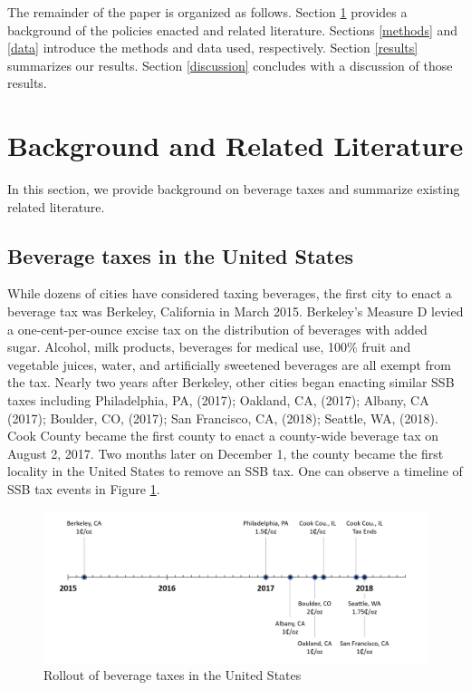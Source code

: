 \documentclass[12pt]{article}
\begin{document}
The remainder of the paper is organized as follows. Section \ref{background} provides a background of the policies enacted and related literature. Sections \ref{methods} and \ref{data} introduce the methods and data used, respectively. Section \ref{results} summarizes our results. Section \ref{discussion} concludes with a discussion of those results.

\section{Background and Related Literature} \label{background}

In this section, we provide background on beverage taxes and summarize existing related literature.

\subsection{Beverage taxes in the United States}

While dozens of cities have considered taxing beverages, the first city to enact a beverage tax was Berkeley, California in March 2015. Berkeley's Measure D levied a one-cent-per-ounce excise tax on the distribution of beverages with added sugar. Alcohol, milk products, beverages for medical use, 100\% fruit and vegetable juices, water, and artificially sweetened beverages are all exempt from the tax. Nearly two years after Berkeley, other cities began enacting similar SSB taxes including Philadelphia, PA, (2017); Oakland, CA, (2017); Albany, CA (2017); Boulder, CO, (2017); San Francisco, CA, (2018); Seattle, WA, (2018). Cook County became the first county to enact a county-wide beverage tax on August 2, 2017. Two months later on December 1, the county became the first locality in the United States to remove an SSB tax. One can observe a timeline of SSB tax events in Figure \ref{taxtimeline}.

\begin{figure}[t]\centering
\includegraphics[width = \textwidth]{../figures/taxtimeline.png}
\caption{Rollout of beverage taxes in the United States \label{taxtimeline}}
\end{figure}
\end{document}
